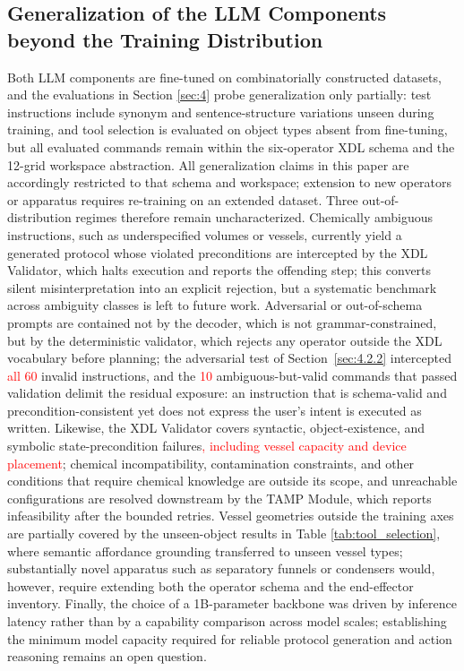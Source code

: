 \documentclass{ieeeaccess}
\newif\ifhighlight
\newcommand{\rev}[1]{\ifhighlight\hl{#1}\else#1\fi}
\newcommand{\nd}[1]{\textcolor{red}{#1}}
\begin{document}
\subsection{Generalization of the LLM Components beyond the Training Distribution}\label{sec:5.3}
Both LLM components are fine-tuned on combinatorially constructed datasets, and the evaluations in Section \ref{sec:4} probe generalization only partially: test instructions include synonym and sentence-structure variations unseen during training, and tool selection is evaluated on object types absent from fine-tuning, but all evaluated commands remain within the six-operator XDL schema and the 12-grid workspace abstraction.
\rev{All generalization claims in this paper are accordingly restricted to that schema and workspace; extension to new operators or apparatus requires re-training on an extended dataset.}
Three out-of-distribution regimes therefore remain uncharacterized. Chemically ambiguous instructions, such as underspecified volumes or vessels, currently yield a generated protocol whose violated preconditions are intercepted by the XDL Validator, which halts execution and reports the offending step; this converts silent misinterpretation into an explicit rejection, but a systematic benchmark across ambiguity classes is left to future work. \rev{Adversarial or out-of-schema prompts are contained not by the decoder, which is not grammar-constrained, but by the deterministic validator, which rejects any operator outside the XDL vocabulary before planning; the adversarial test of Section~\ref{sec:4.2.2} intercepted \nd{all 60} invalid instructions, and the \nd{10} ambiguous-but-valid commands that passed validation delimit the residual exposure: an instruction that is schema-valid and precondition-consistent yet does not express the user's intent is executed as written.
Likewise, the XDL Validator covers syntactic, object-existence, and symbolic state-precondition failures\nd{, including vessel capacity and device placement}; chemical incompatibility, contamination constraints, and other conditions that require chemical knowledge are outside its scope, and unreachable configurations are resolved downstream by the TAMP Module, which reports infeasibility after the bounded retries.} Vessel geometries outside the training axes are partially covered by the unseen-object results in Table \ref{tab:tool_selection}, where semantic affordance grounding transferred to unseen vessel types; substantially novel apparatus such as separatory funnels or condensers would, however, require extending both the operator schema and the end-effector inventory. Finally, the choice of a 1B-parameter backbone was driven by inference latency rather than by a capability comparison across model scales; establishing the minimum model capacity required for reliable protocol generation and action reasoning remains an open question.
\end{document}

